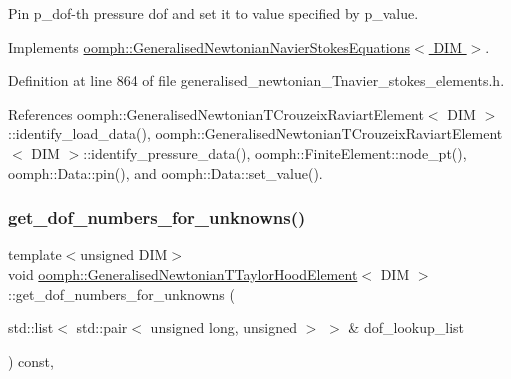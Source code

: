 Pin p\+\_\+dof-\/th pressure dof and set it to value specified by p\+\_\+value. 



Implements \hyperlink{classoomph_1_1GeneralisedNewtonianNavierStokesEquations_a1a39938f37a0a61229e273ea541d5437}{oomph\+::\+Generalised\+Newtonian\+Navier\+Stokes\+Equations$<$ D\+I\+M $>$}.



Definition at line 864 of file generalised\+\_\+newtonian\+\_\+\+Tnavier\+\_\+stokes\+\_\+elements.\+h.



References oomph\+::\+Generalised\+Newtonian\+T\+Crouzeix\+Raviart\+Element$<$ D\+I\+M $>$\+::identify\+\_\+load\+\_\+data(), oomph\+::\+Generalised\+Newtonian\+T\+Crouzeix\+Raviart\+Element$<$ D\+I\+M $>$\+::identify\+\_\+pressure\+\_\+data(), oomph\+::\+Finite\+Element\+::node\+\_\+pt(), oomph\+::\+Data\+::pin(), and oomph\+::\+Data\+::set\+\_\+value().

\mbox{\label{classoomph_1_1GeneralisedNewtonianTTaylorHoodElement_aae85d62a6cf20353fa93b75dc8f5182b}} 
\subsubsection{\texorpdfstring{get\+\_\+dof\+\_\+numbers\+\_\+for\+\_\+unknowns()}{get\_dof\_numbers\_for\_unknowns()}}
{\footnotesize\ttfamily template$<$unsigned D\+IM$>$ \\
void \hyperlink{classoomph_1_1GeneralisedNewtonianTTaylorHoodElement}{oomph\+::\+Generalised\+Newtonian\+T\+Taylor\+Hood\+Element}$<$ D\+IM $>$\+::get\+\_\+dof\+\_\+numbers\+\_\+for\+\_\+unknowns (\begin{DoxyParamCaption}\item[{std\+::list$<$ std\+::pair$<$ unsigned long, unsigned $>$ $>$ \&}]{dof\+\_\+lookup\+\_\+list }\end{DoxyParamCaption}) const\hspace{0.3cm}{\ttfamily [inline]}, {\ttfamily [virtual]}}



